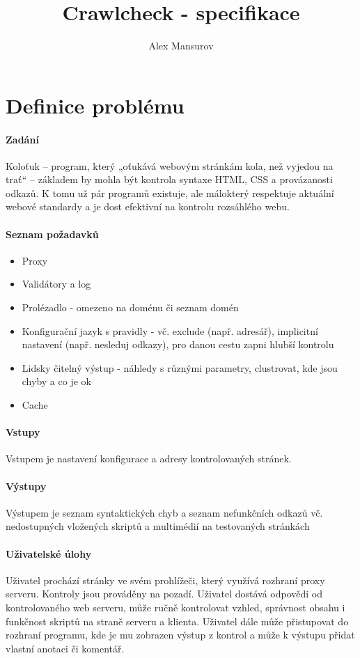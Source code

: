 \documentclass[10pt]{article}
\begin{document}
\title{Crawlcheck - specifikace}
\author{Alex Mansurov}
\maketitle
\newpage
\section{Definice probl\'emu}
\paragraph{Zad\'an\'i}
Koloťuk – program, který „oťukává webovým stránkám kola, než vyjedou na trať“ – základem by mohla být kontrola syntaxe HTML, CSS a provázanosti odkazů. K tomu už pár programů existuje, ale málokterý respektuje aktuální webové standardy a je dost efektivní na kontrolu rozsáhlého webu. 
\paragraph{Seznam po\v{z}adavk\r{u}}
\begin{itemize}
	\item Proxy
	\item Valid\'atory a log
	\item Prol\'ezadlo - omezeno na doménu či seznam domén
	\item Konfigura\v{c}n\'i jazyk s pravidly - vč. exclude (např. adresář), implicitní nastavení (např. nesleduj odkazy), pro danou cestu zapni hlubší kontrolu
	\item Lidsky \v{c}iteln\'y v\'ystup - náhledy s různými parametry, clustrovat, kde jsou chyby a co je ok
	\item Cache
\end{itemize}
\paragraph{Vstupy} Vstupem je nastaven\'i konfigurace a adresy kontrolovan\'ych str\'anek.
\paragraph{V\'ystupy} V\'ystupem je seznam syntaktick\'ych chyb a seznam nefunk\v{c}n\'ich odkaz\r{u} v\v{c}. nedostupn\'ych vlo\v{z}en\'ych skript\r{u} a multim\'edi\'i na testovan\'ych str\'ank\'ach
\paragraph{U\v{z}ivatelsk\'e \'ulohy} U\v{z}ivatel proch\'az\'i str\'anky ve sv\'em prohl\'i\v{z}e\v{c}i, kter\'y vyu\v{z}\'iv\'a rozhran\'i proxy serveru. Kontroly jsou prov\'ad\v{e}ny na pozad\'i. U\v{z}ivatel dost\'av\'a odpov\v{e}di od kontrolovan\'eho web serveru, m\r{u}\v{z}e ru\v{c}n\v{e} kontrolovat vzhled, spr\'avnost obsahu i funk\v{c}nost skript\r{u} na stran\v{e} serveru a klienta. U\v{z}ivatel d\'ale m\r{u}\v{z}e p\v{r}istupovat do rozhran\'i programu, kde je mu zobrazen v\'ystup z kontrol a může k výstupu přidat vlastní anotaci či komentář.
\end{document}
